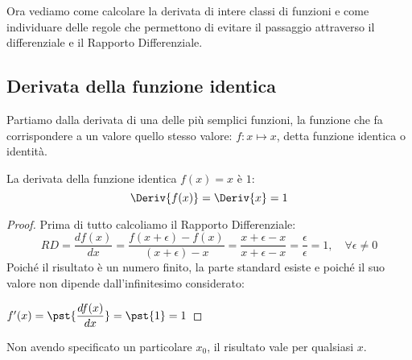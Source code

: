 Ora vediamo come calcolare la derivata di intere classi di funzioni e 
come individuare delle regole che permettono di evitare il passaggio 
attraverso il differenziale e il Rapporto Differenziale.

% 

\subsection{Derivata della funzione identica}
\label{subsec:differenziazione_derivatafidentica}

Partiamo dalla derivata di una delle più semplici funzioni, la funzione 
che fa corrispondere a un valore quello stesso valore: 
\(f: x \mapsto x\), detta funzione identica o identità.
\begin{teorema}
La derivata della funzione identica \(f(x)=x\) \quad è \quad \(1\):
\[\Deriv{f(x)} = \Deriv{x} = 1\]
\end{teorema}
\begin{proof}
Prima di tutto calcoliamo il Rapporto Differenziale:
\[RD = \dfrac{df(x)}{dx}=
\dfrac{f(x+\epsilon)-f(x)}{(x +\epsilon) -x}=
\dfrac{x+\epsilon-x}{x +\epsilon -x}=
\dfrac{\epsilon}{\epsilon}=1, \quad 
\forall \epsilon \ne 0\]
Poiché il risultato è un numero finito, la parte standard esiste e 
poiché il suo valore non dipende dall'infinitesimo considerato:

\hspace{40mm} \(f'(x)=\pst{\dfrac{df(x)}{dx}}=\pst{1}=1\)
\end{proof}

\begin{osservazione}
Non avendo specificato un particolare \(x_0\), il risultato vale per 
qualsiasi \(x\).
\end{osservazione}

